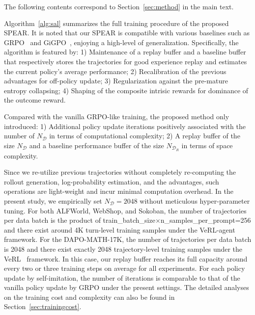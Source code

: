 \documentclass[]{youtu} %
\newcommand{\method}{\textsc{SPEAR}\xspace}
\begin{document}
The following contents correspond to Section~\ref{sec:method} in the main text.



Algorithm~\ref{alg:sal} summarizes the full training procedure of the proposed \method.
It is noted that our \method is compatible with various baselines such as GRPO~\cite{shao2024deepseekmath} and GiGPO~\cite{feng2025group},
enjoying a high-level of generalization.
Specifically,
the algorithm is featured by:
1) Maintenance of a replay buffer and a baseline buffer that respectively stores the trajectories for good experience replay and estimates the current policy's average performance;
2) Recalibration of the previous advantages for off-policy update;
3) Regularization against the pre-mature entropy collapsing;
4) Shaping of the composite intrisic rewards for dominance of the outcome reward.


Compared with the vanilla GRPO-like training,
the proposed method only introduced:
1) Additional policy update iterations positively associated with the number of $N_{\mathcal{D}}$ in terms of computational complexity;
2) A replay buffer of the size $N_{\mathcal{D}}$ and a baseline performance buffer of the size $N_{\mathcal{D}_R}$ in terms of space complexity.



Since we re-utilize previous trajectories without completely re-computing the rollout generation, log-probability estimation, and the advantages,
such operations are light-weight and incur minimal computation overhead.
In the present study,
we empirically set $N_{\mathcal{D}}=2048$ without meticulous hyper-parameter tuning.
For both ALFWorld, WebShop, and Sokoban,
the number of trajectories per data batch is the product of train\_batch\_size$\times$n\_samples\_per\_prompt=256 and there exist around 4K turn-level training samples under the VeRL-agent~\cite{feng2025group} framework.
For the DAPO-MATH-17K,
the number of trajectories per data batch is 2048 and there exist exactly 2048 trajectory-level training samples under the VeRL~\cite{sheng2024hybridflow} framework.
In this case,
our replay buffer reaches its full capacity around every two or three training steps on average for all experiments.
For each policy update by self-imitation,
the number of iterations is comparable to that of the vanilla policy update by GRPO under the present settings.
The detailed analyses on the training cost and complexity can also be found in Section~\ref{sec:trainingcost}.
\end{document}
